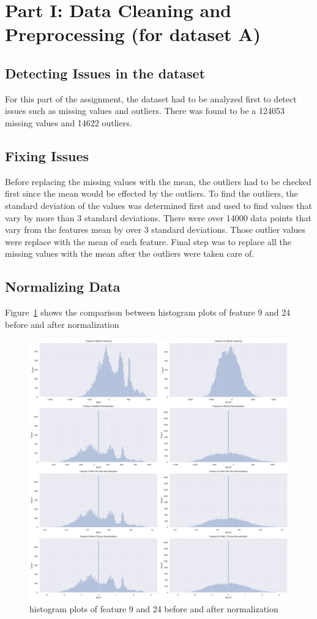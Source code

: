\section{Part I: Data Cleaning and Preprocessing (for dataset A)}
\subsection{Detecting Issues in the dataset}
For this part of the assignment, the dataset had to be analyzed first to detect issues such as missing values and outliers. There was found to be a 124053 missing values and 14622 outliers.  

\subsection{Fixing Issues}
Before replacing the missing values with the mean, the outliers had to be checked first since the mean would be effected by the outliers. To find the outliers, the standard deviation of the values was determined first and used to find values that vary by more than 3 standard deviations. There were over 14000 data points that vary from the features mean by over 3 standard deviations. Those outlier values were replace with the mean of each feature. Final step was to replace all the missing values with the mean after the outliers were taken care of. 


\subsection{Normalizing Data}

Figure~\ref{fig:fig1} shows the comparison between histogram plots of feature 9 and 24 before and after normalization

%
%

\begin{figure}[!ht]
 \centering
\includegraphics[width=6.1in]{assignment1/1-3-histograms.png}
\caption{\label{fig:fig1}histogram plots of feature 9 and 24 before and after normalization}
\end{figure}
